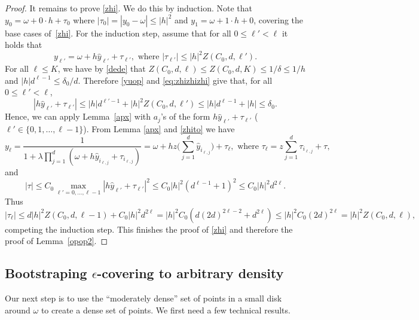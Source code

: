 \documentclass[11pt]{article}
\newcommand{\eps}{\epsilon}
\begin{document}
\begin{proof}
It remains to prove \eqref{zhi}. We do this by induction. 
Note that $y_0 = \omega + 0\cdot h + \tau_0$ where $|\tau_0|=|y_0-\omega|\leq |h|^2$ and $y_1 = \omega+1\cdot h+0$, covering the base cases of~\eqref{zhi}. For the induction step, assume that for all $0\leq \ell'<\ell$ it holds that
\begin{equation}\label{eq:zhizhizhi}
y_{\ell'} = \omega + h \hat{y}_{\ell'} + \tau_{\ell'},\mbox{ where } |\tau_{\ell'}|\leq |h|^2 Z(C_0,d,\ell').
\end{equation}
For all $\ell\leq K$, we have by \eqref{dede} that $Z(C_0,d,\ell)\leq Z(C_0,d,K)\leq 1/\delta\leq 1/h$ and $|h| d^{\ell - 1}\leq \delta_0/d$. Therefore \eqref{yuop} and \eqref{eq:zhizhizhi} give that, for all $0\leq \ell'<\ell$,
\begin{equation}\label{zhito}
|h \hat{y}_{\ell'} + \tau_{\ell'}| \leq |h| d^{\ell'-1} + |h|^2 Z(C_0,d,\ell') \leq |h| d^{\ell - 1} + |h| \leq \delta_0.
\end{equation}
Hence, we can apply Lemma~\ref{apx} with $a_j$'s of the form $h \hat{y}_{\ell'} + \tau_{\ell'}$ ($\ell'\in \{0,1,\hdots,\ell-1\}$).
From Lemma \ref{apx} and \eqref{zhito} we have
\begin{equation*}
y_\ell = \frac{1}{1+\lambda \prod_{j=1}^d (\omega + h \hat{y}_{i_{\ell,j}} + \tau_{i_{\ell,j}})} =\omega +
h z \Big(\sum_{j=1}^d \hat{y}_{i_{\ell,j}} \Big) + \tau_\ell, \mbox{ where } \tau_\ell = z \sum_{j=1}^d \tau_{i_{\ell,j}} + \tau,
\end{equation*}
and
$$
|\tau|\leq C_0 \max_{\ell'=0,\hdots,\ell-1}|h \hat{y}_{\ell'} + \tau_{\ell'}|^2 \leq C_0 |h|^2 (d^{\ell-1} + 1 )^2 \leq C_0|h|^2 d^{2\ell}.
$$
Thus
$$
|\tau_\ell| \leq d |h|^2 Z(C_0,d,\ell-1) + C_0 |h|^2 d^{2\ell} = |h|^2 C_0 ( d (2d)^{2\ell-2} + d^{2\ell} )
\leq |h|^2 C_0 (2d)^{2\ell}  =  |h|^2 Z(C_0,d,\ell),
$$
competing the induction step. This finishes the proof of \eqref{zhi} and therefore the proof of Lemma~\ref{opop2}.
\end{proof}



\subsection{Bootstraping $\eps$-covering to arbitrary density}\label{sec:tv45vef}

Our next step is to use the ``moderately dense'' set of points in a small disk around $\omega$ to create a
dense set of points.  We first need a few technical results.
\end{document}
